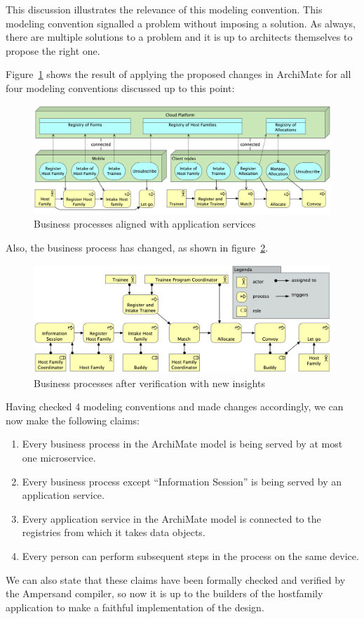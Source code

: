 \documentclass[sn-vancouver]{sn-jnl}%
\theoremstyle{thmstyleone}%
\theoremstyle{thmstyletwo}%
\theoremstyle{thmstylethree}%
\begin{document}
This discussion illustrates the relevance of this modeling convention.
This modeling convention signalled a problem without imposing a solution.
As always, there are multiple solutions to a problem and it is up to architects themselves to propose the right one.

Figure~\ref{fig: Adapted service alignment} shows the result of applying the proposed changes in ArchiMate for all four modeling conventions discussed up to this point:
\begin{figure}[b]
  \centering
  \includegraphics[clip=true, scale=0.0627]{Services na Uitvoering.png}
  \caption{Business processes aligned with application services}
  \label{fig: Adapted service alignment}
\end{figure}
Also, the business process has changed, as shown in figure~\ref{fig: Business Process na Uitvoering}.
\begin{figure}[b]
\centering
    \includegraphics[clip=true, scale=0.254]{Business Process na Uitvoering.png}
\caption{Business processes after verification with new insights}
\label{fig: Business Process na Uitvoering}
\end{figure}

Having checked 4 modeling conventions and made changes accordingly, we can now make the following claims:
\begin{enumerate}
    \item Every business process in the ArchiMate model is being served by at most one microservice.
    \item Every business process except ``Information Session'' is being served by an application service.
    \item Every application service in the ArchiMate model is connected to the registries from which it takes data objects.
    \item Every person can perform subsequent steps in the process on the same device.
\end{enumerate}
We can also state that these claims have been formally checked and verified by the Ampersand compiler,
so now it is up to the builders of the hostfamily application to make a faithful implementation of the design.
\end{document}
